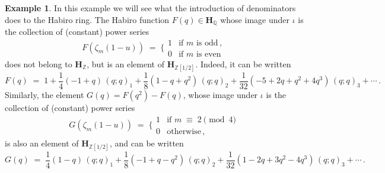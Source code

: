 \documentclass[12pt,reqno]{amsart}
\theoremstyle{definition}
\newtheorem{example}[proposition]{Example}
\def\BZ{\mathbb Z}
\def\BQ{\mathbb Q}
\def\HH{\mathbf H}
\def\be{\begin{equation}}
\def\ee{\end{equation}}
\def\z{\zeta}
\def\={\;=\;}
\begin{document}
\begin{example}
In this example we will see what the introduction of denominators does to the
Habiro ring. The Habiro function $F(q)\in\HH_\BQ$ whose image under $\iota$ is the
collection of (constant) power series
\be
F(\z_m(1-u)) \=
\bigg\{
\begin{array}{cl}
1 & \text{if }m\text{ is odd}\,,\\
0 & \text{if }m\text{ is even}\,
\end{array}
\ee
does not belong to $\HH_{\BZ}$, but is an element of $\HH_{\BZ[1/2]}$. Indeed, it
can be written
\be
F(q)\=1
+\frac{1}{4}(-1+q)\,(q;q)_1
+\frac{1}{8}(1-q+q^2)\,(q;q)_2
+\frac{1}{32}(-5+2q+q^2+4q^3)\,(q;q)_3+\cdots\,.
\ee
Similarly, the element $G(q)=F(q^2)-F(q)$, whose image under $\iota$ is the
collection of (constant) power series
\be
G(\z_m(1-u)) \=
\bigg\{
\begin{array}{cl}
1 & \text{if }m\;\equiv\;2\pmod{4}\\
0 & \text{otherwise}\,,
\end{array}
\ee
is also an element of $\HH_{\BZ[1/2]}$, and can be written
\be
G(q) \=
\frac{1}{4}(1-q)\,(q;q)_1
+\frac{1}{8}(-1+q-q^2)\,(q;q)_2
+\frac{1}{32}(1-2q+3q^2-4q^3)\,(q;q)_3+\cdots\,.
\ee
\end{example}
\end{document}
